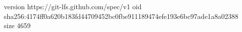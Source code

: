 version https://git-lfs.github.com/spec/v1
oid sha256:4174ff0a620b183fd44709452bc0fbe911189474efe193e6bc97ade1a8a02388
size 4659

